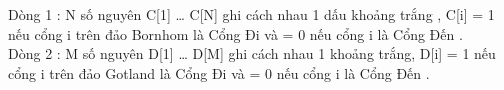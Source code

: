 Dòng 1 : N số nguyên C[1] … C[N] ghi cách nhau 1 dấu khoảng trắng , C[i] = 1 nếu cổng i trên đảo Bornhom là Cổng Đi và = 0 nếu cổng i là Cổng Đến .
\\Dòng 2 : M số nguyên D[1] … D[M] ghi cách nhau 1 khoảng trắng, D[i] = 1 nếu cổng i trên đảo Gotland là Cổng Đi và = 0 nếu cổng i là Cổng Đến .

\